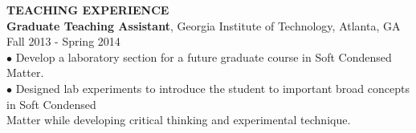 \documentclass[10pt]{article}
\begin{document}








\textbf{\large TEACHING EXPERIENCE} \\
{\bf Graduate Teaching Assistant}, Georgia Institute of Technology, Atlanta, GA \hfill Fall 2013 - Spring 2014\\
\hspace*{10pt}$\bullet$ Develop a laboratory section for a future graduate course in Soft Condensed Matter.  \\
\hspace*{10pt}$\bullet$ Designed lab experiments to introduce the student to important broad concepts in Soft Condensed \\ \hspace*{15pt} Matter while developing critical thinking and experimental technique.  \\
\end{document}
